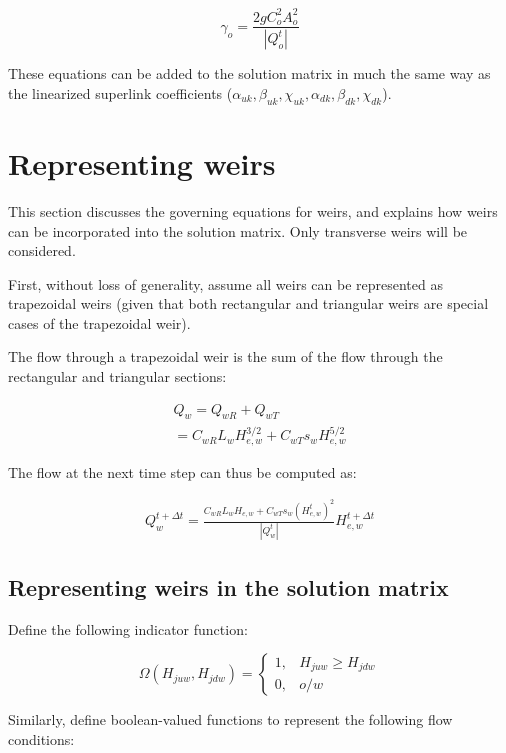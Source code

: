 \documentclass[11pt]{article}
\begin{document}
\begin{equation}
 \gamma_o = \frac{2 g C_o^2 A_o^2}{|Q_o^t|} 
\end{equation}

These equations can be added to the solution matrix in much the same way as the
linearized superlink coefficients ($\alpha_{uk}, \beta_{uk}, \chi_{uk},
\alpha_{dk}, \beta_{dk}, \chi_{dk}$).

\section*{Representing weirs}

This section discusses the governing equations for weirs, and explains how weirs
can be incorporated into the solution matrix. Only transverse weirs will be considered.

First, without loss of generality, assume all weirs can be represented as
trapezoidal weirs (given that both rectangular and triangular weirs are special
cases of the trapezoidal weir).

The flow through a trapezoidal weir is the sum of the flow through the
rectangular and triangular sections:

\begin{align}
  Q_w = Q_{wR} + Q_{wT} \\
  = C_{wR} L_{w} H_{e,w}^{3/2} + C_{wT} s_{w} H_{e,w}^{5/2}
\end{align}

The flow at the next time step can thus be computed as:

\begin{align}
  Q_w^{t + \Delta t} = \frac{C_{wR} L_{w} H_{e,w} + C_{wT} s_{w} (H_{e,w}^{t})^2}{|Q_{w}^t|} H_{e,w}^{t + \Delta t}
\end{align}

\subsection*{Representing weirs in the solution matrix}

Define the following indicator function:

\begin{equation}
  \Omega(H_{juw}, H_{jdw}) = 
  \begin{cases}
    1, & H_{juw} \geq H_{jdw} \\
    0, & o/w
  \end{cases}
\end{equation}

Similarly, define boolean-valued functions to represent the following flow conditions:
\end{document}
